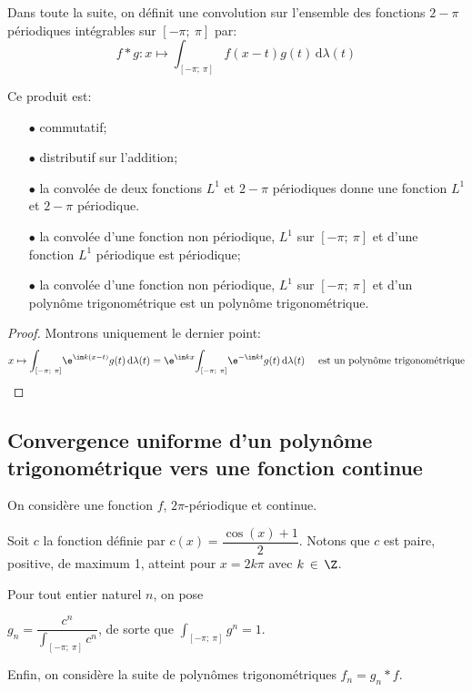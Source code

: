 \begin{prop}
Dans toute la suite, on définit une convolution sur l'ensemble des fonctions $2-\pi$ périodiques intégrables sur $[-\pi;~\pi]$ par:
\[
f * g: x \mapsto \displaystyle{\int_{[-\pi;~\pi]}} f(x-t)g(t) \, \mathrm d \lambda(t)
\]

Ce produit est:
\begin{itemize}
\item[$\bullet$]
commutatif;
\item[$\bullet$]
distributif sur l'addition;
\item[$\bullet$]
la convolée de deux fonctions $L^1$ et $2-\pi$ périodiques donne une fonction $L^1$ et $2-\pi$ périodique.
\item[$\bullet$]
la convolée d'une fonction non périodique, $L^1$ sur $[-\pi;~\pi]$ et d'une fonction $L^1$ périodique est périodique;
\item[$\bullet$]
la convolée d'une fonction non périodique, $L^1$ sur $[-\pi;~\pi]$ et d'un polynôme trigonométrique est un polynôme trigonométrique.
\end{itemize}
\end{prop}

\begin{proof}
Montrons uniquement le dernier point:
\[
x \mapsto \displaystyle{\int_{[-\pi;~\pi]}} \e^{\im k (x-t)}g(t) \, \mathrm d \lambda(t) = \e^{\im k x}\displaystyle{\int_{[-\pi;~\pi]}} \e^{-\im k t}g(t) \, \mathrm d \lambda(t) \quad \text{ est un polynôme trigonométrique}
\]
\end{proof}

\subsection{Convergence uniforme d'un polynôme trigonométrique vers une fonction continue}

On considère une fonction $f$, $2\pi$-périodique et continue.

Soit $c$ la fonction définie par $c(x)=\dfrac{\cos(x)+1}{2}$. Notons que $c$ est paire, positive, de maximum 1, atteint pour $x=2k\pi$ avec $k \, \in \, \Z$. 

Pour tout entier naturel $n$, on pose

$g_n = \dfrac{c^n}{\displaystyle{\int_{[-\pi;~\pi]}} c^n}$, de sorte que $\displaystyle{\int_{[-\pi;~\pi]}} g^n = 1$.

Enfin, on considère la suite de polynômes trigonométriques $f_n = g_n*f$.

